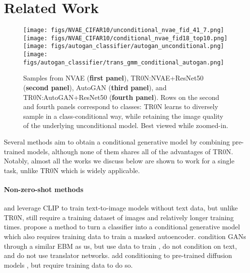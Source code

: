\documentclass[nohyperref]{article}
\theoremstyle{plain}
\theoremstyle{definition}
\theoremstyle{remark}
\begin{document}
%
 
\section{Related Work}
\begin{figure*}[t!]
    \centering
    \texttt{[image: figs/NVAE\_CIFAR10/unconditional\_nvae\_fid\_41\_7.png]} \hspace{0.05cm}
    \texttt{[image: figs/NVAE\_CIFAR10/conditional\_nvae\_fid18\_top10.png]}
    \hspace{0.05cm}
    \texttt{[image: figs/autogan\_classifier/autogan\_unconditional.png]}
    \hspace{0.05cm}
    \texttt{[image: figs/autogan\_classifier/trans\_gmm\_conditional\_autogan.png]}
    \caption{Samples from NVAE (\textbf{first panel}), TR0N:NVAE+ResNet50 (\textbf{second panel}), AutoGAN (\textbf{third panel}), and TR0N:AutoGAN+ResNet50 (\textbf{fourth panel}). Rows on the second and fourth panels correspond to classes: TR0N  learns to diversely sample in a class-conditional way, while retaining the image quality of the underlying unconditional model. Best viewed while zoomed-in.}
    \label{fig:cifar_conditioning}
\end{figure*}

Several methods aim to obtain a conditional generative model by combining pre-trained models, although none of them shares all of the advantages of TR0N. 
Notably, almost all the works we discuss below are shown to work for a single task, unlike TR0N which is widely applicable.

\paragraph{Non-zero-shot methods} \citet{Zhou2021TowardsLT} and \citet{Wang2022CLIPGENLT} leverage CLIP to train text-to-image models without text data, but unlike TR0N, still require a training dataset of images and relatively longer training times. \citet{wang2022traditional} propose a method to turn a classifier into a conditional generative model which also requires training data to train a masked autoencoder. \citet{nie2021controllable} condition GANs through a similar EBM as us, but use data to train , do not condition on text, and do not use translator networks. \citet{zhang2023adding} add conditioning to pre-trained diffusion models \citep{ho2020denoising}, but require training data to do so.
\end{document}
